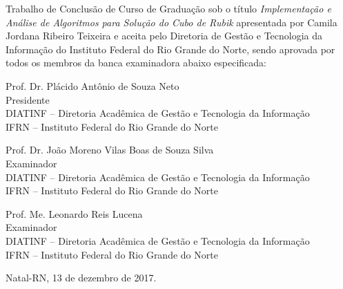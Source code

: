 \begin{folhadeaprovacao}
	\setlength{\ABNTsignthickness}{0.4pt}
	\setlength{\ABNTsignwidth}{10cm}
	
	\noindent 
	Trabalho de Conclusão de Curso de Graduação sob o título
	\textit{Implementação e Análise de Algoritmos para Solução do Cubo de Rubik} apresentada por Camila Jordana Ribeiro Teixeira e aceita pelo Diretoria
	de Gestão e Tecnologia da Informação do Instituto Federal do Rio Grande do
	Norte, sendo aprovada por todos os membros da banca examinadora abaixo especificada:
		
	\assinatura
	{
		Prof. Dr. Plácido Antônio de Souza Neto   			                  \\
		{\small Presidente}											          \smallskip\\ 
		{\footnotesize
			DIATINF -- Diretoria Acadêmica de Gestão e Tecnologia da Informação		   \\
		  	IFRN -- Instituto Federal do Rio Grande do Norte
		}
   }
      
   \assinatura
	{
      Prof. Dr. João Moreno Vilas Boas de Souza Silva  			                  \\
		{\small Examinador}											          \smallskip\\ 
		{\footnotesize
			DIATINF -- Diretoria Acadêmica de Gestão e Tecnologia da Informação		   \\
		  	IFRN -- Instituto Federal do Rio Grande do Norte
		}
   }   
   
   \assinatura
	{
      Prof. Me. Leonardo Reis Lucena 			                  \\
		{\small Examinador}											          \smallskip\\ 
		{\footnotesize
			DIATINF -- Diretoria Acadêmica de Gestão e Tecnologia da Informação		   \\
		  	IFRN -- Instituto Federal do Rio Grande do Norte
		}
	}
		
	\vfill
	
	\begin{center}
		Natal-RN, 13 de dezembro de 2017.
	\end{center}
\end{folhadeaprovacao}

